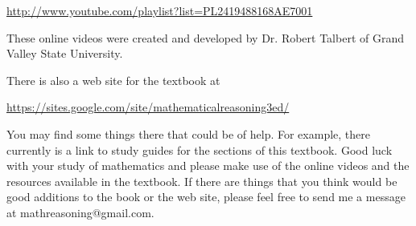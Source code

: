 \begin{center}
\href{http://www.youtube.com/playlist?list=PL2419488168AE7001}
{http://www.youtube.com/playlist?list=PL2419488168AE7001}
\end{center}
These online videos were created and developed by Dr. Robert Talbert of Grand Valley State University.

There is also a web site for the textbook at
\begin{center}
\href{https://sites.google.com/site/mathematicalreasoning3ed/}
{https://sites.google.com/site/mathematicalreasoning3ed/}
\end{center}
You may find some things there that could be of help.  For example, there currently is a link to study guides for the sections of this textbook.
Good luck with your study of mathematics and please make use of the online videos and the resources available in the textbook.  If there are things that you think would be good additions to the book or the web site, please feel free to send me a message at mathreasoning@gmail.com.




\endinput

